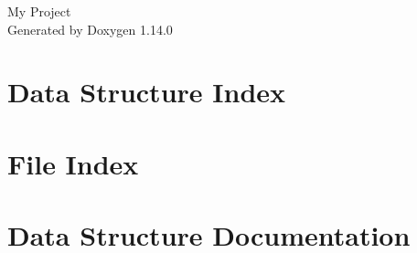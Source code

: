 \documentclass[twoside]{book}
\newcommand{\+}{\discretionary{\mbox{\scriptsize$\hookleftarrow$}}{}{}}
\newcommand{\clearemptydoublepage}{%
    \newpage{\pagestyle{empty}\cleardoublepage}%
  }
\begin{document}
  \raggedbottom
    \hypersetup{pageanchor=false,
                bookmarksnumbered=true,
                pdfencoding=unicode
               }
  \begin{titlepage}
  \vspace*{7cm}
  \begin{center}%
  {\Large My Project}\\
  \vspace*{1cm}
  {\large Generated by Doxygen 1.14.0}\\
  \end{center}
  \end{titlepage}
  \clearemptydoublepage
  \tableofcontents
  \clearemptydoublepage
  \hypersetup{pageanchor=true}
\chapter{Data Structure Index}

\chapter{File Index}

\chapter{Data Structure Documentation}
























































\end{document}
